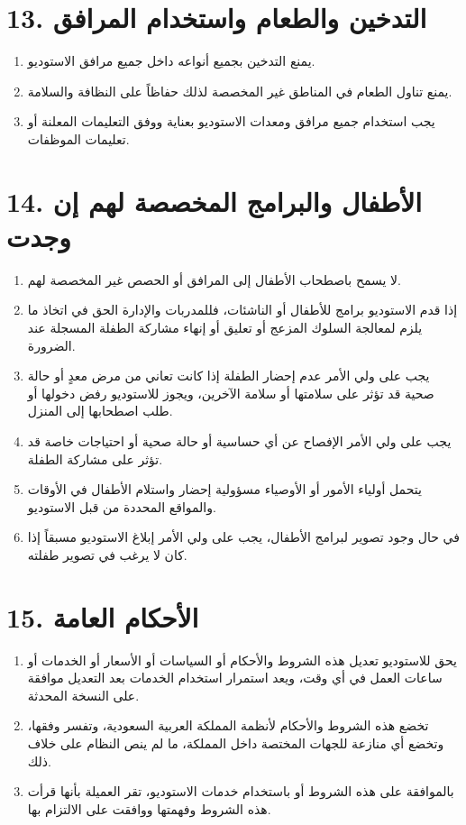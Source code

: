 \documentclass[12pt,a4paper]{article}
\begin{document}
\section*{13. التدخين والطعام واستخدام المرافق}
\begin{enumerate}
    \item يمنع التدخين بجميع أنواعه داخل جميع مرافق الاستوديو.
    \item يمنع تناول الطعام في المناطق غير المخصصة لذلك حفاظاً على النظافة والسلامة.
    \item يجب استخدام جميع مرافق ومعدات الاستوديو بعناية ووفق التعليمات المعلنة أو تعليمات الموظفات.
\end{enumerate}

\section*{14. الأطفال والبرامج المخصصة لهم إن وجدت}
\begin{enumerate}
    \item لا يسمح باصطحاب الأطفال إلى المرافق أو الحصص غير المخصصة لهم.
    \item إذا قدم الاستوديو برامج للأطفال أو الناشئات، فللمدربات والإدارة الحق في اتخاذ ما يلزم لمعالجة السلوك المزعج أو تعليق أو إنهاء مشاركة الطفلة المسجلة عند الضرورة.
    \item يجب على ولي الأمر عدم إحضار الطفلة إذا كانت تعاني من مرض معدٍ أو حالة صحية قد تؤثر على سلامتها أو سلامة الآخرين، ويجوز للاستوديو رفض دخولها أو طلب اصطحابها إلى المنزل.
    \item يجب على ولي الأمر الإفصاح عن أي حساسية أو حالة صحية أو احتياجات خاصة قد تؤثر على مشاركة الطفلة.
    \item يتحمل أولياء الأمور أو الأوصياء مسؤولية إحضار واستلام الأطفال في الأوقات والمواقع المحددة من قبل الاستوديو.
    \item في حال وجود تصوير لبرامج الأطفال، يجب على ولي الأمر إبلاغ الاستوديو مسبقاً إذا كان لا يرغب في تصوير طفلته.
\end{enumerate}

\section*{15. الأحكام العامة}
\begin{enumerate}
    \item يحق للاستوديو تعديل هذه الشروط والأحكام أو السياسات أو الأسعار أو الخدمات أو ساعات العمل في أي وقت، ويعد استمرار استخدام الخدمات بعد التعديل موافقة على النسخة المحدثة.
    \item تخضع هذه الشروط والأحكام لأنظمة المملكة العربية السعودية، وتفسر وفقها، وتخضع أي منازعة للجهات المختصة داخل المملكة، ما لم ينص النظام على خلاف ذلك.
    \item بالموافقة على هذه الشروط أو باستخدام خدمات الاستوديو، تقر العميلة بأنها قرأت هذه الشروط وفهمتها ووافقت على الالتزام بها.
\end{enumerate}
\end{document}
